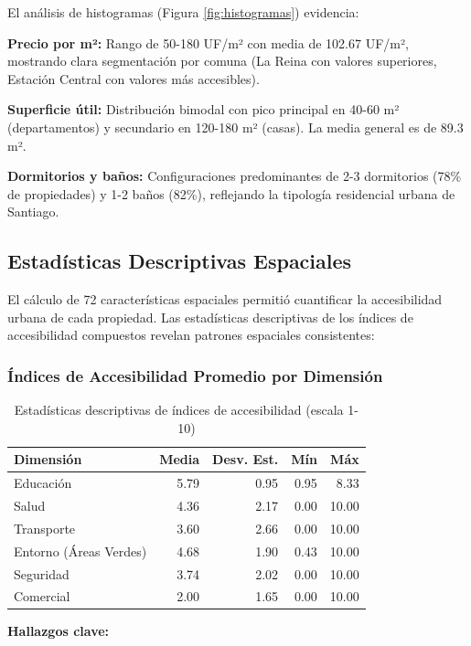 El análisis de histogramas (Figura \ref{fig:histogramas}) evidencia:

\textbf{Precio por m²:} Rango de 50-180 UF/m² con media de 102.67 UF/m², mostrando clara segmentación por comuna (La Reina con valores superiores, Estación Central con valores más accesibles).

\textbf{Superficie útil:} Distribución bimodal con pico principal en 40-60 m² (departamentos) y secundario en 120-180 m² (casas). La media general es de 89.3 m².

\textbf{Dormitorios y baños:} Configuraciones predominantes de 2-3 dormitorios (78\% de propiedades) y 1-2 baños (82\%), reflejando la tipología residencial urbana de Santiago.

\subsection{Estadísticas Descriptivas Espaciales}

El cálculo de 72 características espaciales permitió cuantificar la accesibilidad urbana de cada propiedad. Las estadísticas descriptivas de los índices de accesibilidad compuestos revelan patrones espaciales consistentes:

\subsubsection{Índices de Accesibilidad Promedio por Dimensión}

\begin{table}[H]
\centering
\caption{Estadísticas descriptivas de índices de accesibilidad (escala 1-10)}
\begin{tabular}{@{}lrrrr@{}}
\toprule
\textbf{Dimensión} & \textbf{Media} & \textbf{Desv. Est.} & \textbf{Mín} & \textbf{Máx} \\
\midrule
Educación & 5.79 & 0.95 & 0.95 & 8.33 \\
Salud & 4.36 & 2.17 & 0.00 & 10.00 \\
Transporte & 3.60 & 2.66 & 0.00 & 10.00 \\
Entorno (Áreas Verdes) & 4.68 & 1.90 & 0.43 & 10.00 \\
Seguridad & 3.74 & 2.02 & 0.00 & 10.00 \\
Comercial & 2.00 & 1.65 & 0.00 & 10.00 \\
\bottomrule
\end{tabular}
\end{table}

\textbf{Hallazgos clave:}

